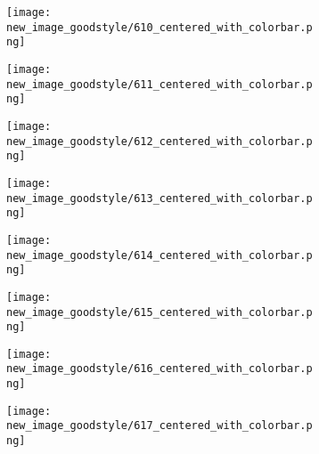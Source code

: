 \documentclass[a4paper,12pt]{article}
\begin{document}
\begin{figure}[H]
  \begin{subfigure}{0.11\textwidth}
    \texttt{[image: new\_image\_goodstyle/610\_centered\_with\_colorbar.png]}
  \end{subfigure}
  \hfill
  \begin{subfigure}{0.11\textwidth}
    \texttt{[image: new\_image\_goodstyle/611\_centered\_with\_colorbar.png]}
  \end{subfigure}
  \hfill
  \begin{subfigure}{0.11\textwidth}
    \texttt{[image: new\_image\_goodstyle/612\_centered\_with\_colorbar.png]}
  \end{subfigure}
  \hfill
  \begin{subfigure}{0.11\textwidth}
    \texttt{[image: new\_image\_goodstyle/613\_centered\_with\_colorbar.png]}
  \end{subfigure}
  \hfill
  \begin{subfigure}{0.11\textwidth}
    \texttt{[image: new\_image\_goodstyle/614\_centered\_with\_colorbar.png]}
  \end{subfigure}
  \hfill
  \begin{subfigure}{0.11\textwidth}
    \texttt{[image: new\_image\_goodstyle/615\_centered\_with\_colorbar.png]}
  \end{subfigure}
  \hfill
  \begin{subfigure}{0.11\textwidth}
    \texttt{[image: new\_image\_goodstyle/616\_centered\_with\_colorbar.png]}
  \end{subfigure}
  \hfill
  \begin{subfigure}{0.11\textwidth}
    \texttt{[image: new\_image\_goodstyle/617\_centered\_with\_colorbar.png]}
  \end{subfigure}
  \hfill
\end{figure}
\end{document}
